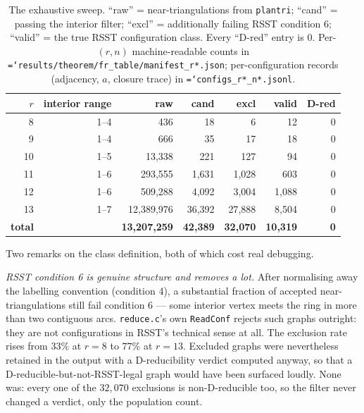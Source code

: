 \documentclass[11pt]{article}
\theoremstyle{definition}
\newcommand{\art}[1]{{\texttt{\hyphenchar\font=`\-\relax #1}}}
\begin{document}
\begin{table}[t]
\centering\small
\caption{The exhaustive sweep. ``raw'' = near-triangulations from \texttt{plantri};
``cand'' = passing the interior filter; ``excl'' = additionally failing RSST
condition 6; ``valid'' = the true RSST configuration class. Every ``D-red'' entry is
$0$. Per-$(r,n)$ machine-readable counts in
\art{results/theorem/fr\_table/manifest\_r*.json}; per-configuration records
(adjacency, $a$, closure trace) in \art{configs\_r*\_n*.jsonl}.}
\label{tab:frsweep}
\begin{tabular}{rrrrrrr}
\toprule
$r$ & interior range & raw & cand & excl & \textbf{valid} & \textbf{D-red} \\
\midrule
8  & 1--4 & 436          & 18     & 6      & 12     & 0 \\
9  & 1--4 & 666          & 35     & 17     & 18     & 0 \\
10 & 1--5 & 13{,}338     & 221    & 127    & 94     & 0 \\
11 & 1--6 & 293{,}555    & 1{,}631& 1{,}028& 603    & 0 \\
12 & 1--6 & 509{,}288    & 4{,}092& 3{,}004& 1{,}088& 0 \\
13 & 1--7 & 12{,}389{,}976 & 36{,}392 & 27{,}888 & 8{,}504 & 0 \\
\midrule
\textbf{total} & & \textbf{13{,}207{,}259} & \textbf{42{,}389} & \textbf{32{,}070} & \textbf{10{,}319} & \textbf{0} \\
\bottomrule
\end{tabular}
\end{table}

Two remarks on the class definition, both of which cost real debugging.

\emph{RSST condition 6 is genuine structure and removes a lot.} After normalising
away the labelling convention (condition 4), a substantial fraction of accepted
near-triangulations still fail condition 6 --- some interior vertex meets the ring in
more than two contiguous arcs. \texttt{reduce.c}'s own \texttt{ReadConf} rejects such
graphs outright: they are not configurations in RSST's technical sense at all. The
exclusion rate rises from $33\%$ at $r=8$ to $77\%$ at $r=13$. Excluded graphs were
nevertheless retained in the output with a D-reducibility verdict computed anyway, so
that a D-reducible-but-not-RSST-legal graph would have been surfaced loudly. None
was: every one of the $32{,}070$ exclusions is non-D-reducible too, so the filter
never changed a verdict, only the population count.
\end{document}
